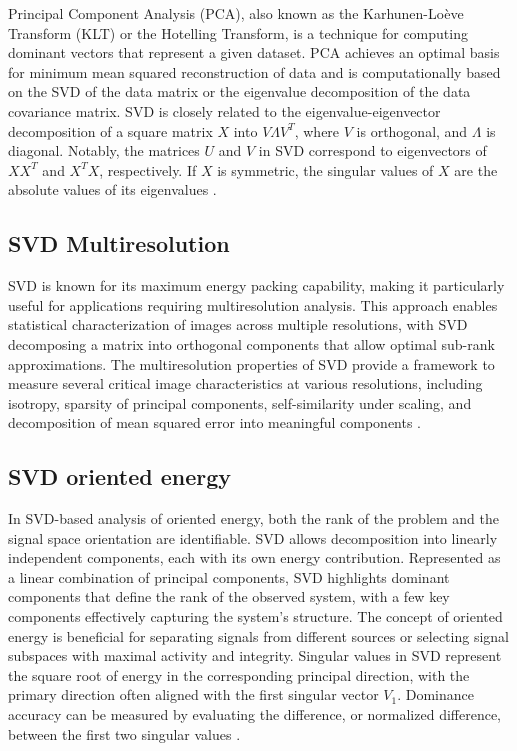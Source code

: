 \documentclass[
  journal,
]{IEEEtran}%
\begin{document}
Principal Component Analysis (PCA), also known as the Karhunen-Loève
Transform (KLT) or the Hotelling Transform, is a technique for computing
dominant vectors that represent a given dataset. PCA achieves an optimal
basis for minimum mean squared reconstruction of data and is
computationally based on the SVD of the data matrix or the eigenvalue
decomposition of the data covariance matrix. SVD is closely related to
the eigenvalue-eigenvector decomposition of a square matrix \(X\) into
\(V\Lambda V^T\), where \(V\) is orthogonal, and \(\Lambda\) is
diagonal. Notably, the matrices \(U\) and \(V\) in SVD correspond to
eigenvectors of \(XX^T\) and \(X^TX\), respectively. If \(X\) is
symmetric, the singular values of \(X\) are the absolute values of its
eigenvalues .

\subsection{SVD Multiresolution}\label{svd-multiresolution}

SVD is known for its maximum energy packing capability, making it
particularly useful for applications requiring multiresolution analysis.
This approach enables statistical characterization of images across
multiple resolutions, with SVD decomposing a matrix into orthogonal
components that allow optimal sub-rank approximations. The
multiresolution properties of SVD provide a framework to measure several
critical image characteristics at various resolutions, including
isotropy, sparsity of principal components, self-similarity under
scaling, and decomposition of mean squared error into meaningful
components .

\subsection{SVD oriented energy}\label{svd-oriented-energy}

In SVD-based analysis of oriented energy, both the rank of the problem
and the signal space orientation are identifiable. SVD allows
decomposition into linearly independent components, each with its own
energy contribution. Represented as a linear combination of principal
components, SVD highlights dominant components that define the rank of
the observed system, with a few key components effectively capturing the
system's structure. The concept of oriented energy is beneficial for
separating signals from different sources or selecting signal subspaces
with maximal activity and integrity. Singular values in SVD represent
the square root of energy in the corresponding principal direction, with
the primary direction often aligned with the first singular vector
\(V_1\). Dominance accuracy can be measured by evaluating the
difference, or normalized difference, between the first two singular
values .
\end{document}
